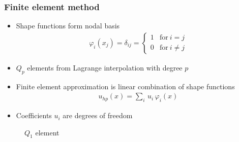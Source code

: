 \begin{frame}
\frametitle{Finite element method}

\begin{minipage}{.59\textwidth}
  \begin{itemize}
  \item Shape functions form nodal basis
    \begin{align*}
    \varphi_i(x_j) = \delta_{ij} =
    \begin{cases}
    1 & \text{for} ~ i=j \\
    0 & \text{for} ~ i \neq j
    \end{cases}
    \end{align*}
  \item $Q_p$ elements from Lagrange interpolation with degree $p$
  \end{itemize}
  
  \vspace{1em}
  
  \begin{itemize}
  \item Finite element approximation is linear combination of shape functions
    \begin{align*}
    u_{hp}(x) = \sum_i \, u_i \, \varphi_i(x)
    \end{align*}
  \item Coefficients $u_i$ are degrees of freedom
  \end{itemize}
\end{minipage}
\hfill
\begin{minipage}{.4\textwidth}
  \vspace{-1em}
  
  \begin{figure}
  \vspace{-0.8em}
  \caption{$Q_1$ element}
  \end{figure}
  

\end{minipage}
\end{frame}

